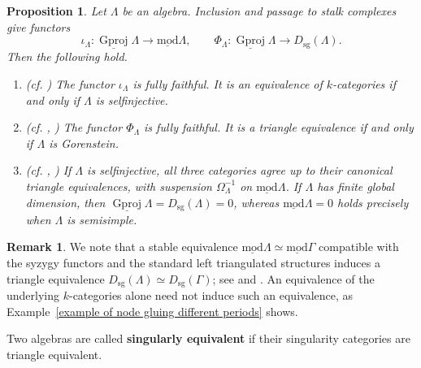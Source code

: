 \documentclass[11pt]{article}
\newcommand{\smod}{\operatorname{\underline{mod}}}
\providecommand{\varLambda}{\Lambda}
\providecommand{\varGamma}{\Gamma}
\newtheorem{proposition}[theorem]{Proposition}
\theoremstyle{definition}
\newtheorem{remark}[theorem]{Remark}
\begin{document}
		\begin{proposition}\label{proposition of stable and singularity comparison}
			Let $\varLambda$ be an algebra. Inclusion and passage to stalk complexes give functors
			\[
				\iota_{\varLambda}:\underline{\operatorname{Gproj}}\varLambda\longrightarrow\smod\varLambda,
				\qquad
				\Phi_{\varLambda}:\underline{\operatorname{Gproj}}\varLambda\longrightarrow D_{\mathrm{sg}}(\varLambda).
			\]
			Then the following hold.
			\begin{enumerate}
				\item \textnormal{(cf. \cite[Proposition~2.3.1]{Che17})}
				The functor $\iota_{\varLambda}$ is fully faithful. It is an equivalence of $k$-categories if and only if $\varLambda$ is selfinjective.

				\item \textnormal{(cf. \cite[Theorem~4.4.1]{Buc87},
					\cite[Theorems~3.1 and~3.6]{BJO15})}
				The functor $\Phi_{\varLambda}$ is fully faithful. It is a triangle equivalence if and only if $\varLambda$ is Gorenstein.

				\item \textnormal{(cf. \cite[Section~1 and Lemma~3.5]{Che18}, \cite[Corollary~2.1.3(2)]{Che17})}
				If $\varLambda$ is selfinjective, all three categories agree up to their canonical triangle equivalences, with suspension $\Omega_{\varLambda}^{-1}$ on $\smod\varLambda$.
				If $\varLambda$ has finite global dimension, then $\underline{\operatorname{Gproj}}\varLambda=D_{\mathrm{sg}}(\varLambda)=0$, whereas $\smod\varLambda=0$ holds precisely when $\varLambda$ is semisimple.
			\end{enumerate}
		\end{proposition}


		\begin{remark}\label{remark of stabilization and singularity categories}
			We note that a stable equivalence $\smod\varLambda\simeq\smod\varGamma$ compatible with the syzygy functors and the standard left triangulated structures induces a triangle equivalence $D_{\mathrm{sg}}(\varLambda)\simeq D_{\mathrm{sg}}(\varGamma)$; see \cite[Example~2.3]{KV87} and \cite[Proposition~3.2]{Che18}. An equivalence of the underlying $k$-categories alone need not induce such an equivalence, as Example~\ref{example of node gluing different periods} shows.
		\end{remark}

		Two algebras are called \textbf{singularly equivalent} if their singularity categories are triangle equivalent.
\end{document}
